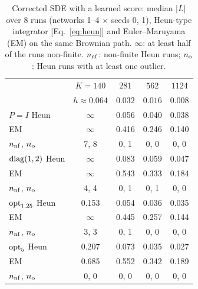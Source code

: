 \begin{table}[t]
\caption{Corrected SDE \Sb{} with a learned score: median $|L|$ over 8 runs (networks 1--4 $\times$ seeds 0, 1), Heun-type integrator [Eq.~\eqref{eq:heun}] and Euler--Maruyama (EM) on the same Brownian path. $\infty$: at least half of the runs non-finite. $n_{\rm nf}$: non-finite Heun runs; $n_{\rm o}$: Heun runs with at least one outlier.}
\label{tab:heun}
\begin{ruledtabular}
\begin{tabular}{lcccc}
 & $K=140$ & $281$ & $562$ & $1124$ \\
 & $h\approx0.064$ & $0.032$ & $0.016$ & $0.008$ \\
\hline
$P=I$ Heun & $\infty$ & 0.056 & 0.040 & 0.038 \\
\quad EM & $\infty$ & 0.416 & 0.246 & 0.140 \\
\quad $n_{\rm nf}$, $n_{\rm o}$ & 7, 8 & 0, 1 & 0, 0 & 0, 0 \\
$\mathrm{diag}(1,2)$ Heun & $\infty$ & 0.083 & 0.059 & 0.047 \\
\quad EM & $\infty$ & 0.543 & 0.333 & 0.184 \\
\quad $n_{\rm nf}$, $n_{\rm o}$ & 4, 4 & 0, 1 & 0, 1 & 0, 0 \\
$\mathrm{opt}_{1.25}$ Heun & 0.153 & 0.054 & 0.036 & 0.035 \\
\quad EM & $\infty$ & 0.445 & 0.257 & 0.144 \\
\quad $n_{\rm nf}$, $n_{\rm o}$ & 3, 3 & 0, 1 & 0, 0 & 0, 0 \\
$\mathrm{opt}_{5}$ Heun & 0.207 & 0.073 & 0.035 & 0.027 \\
\quad EM & 0.685 & 0.552 & 0.342 & 0.189 \\
\quad $n_{\rm nf}$, $n_{\rm o}$ & 0, 0 & 0, 0 & 0, 0 & 0, 0 \\
\end{tabular}
\end{ruledtabular}
\end{table}
